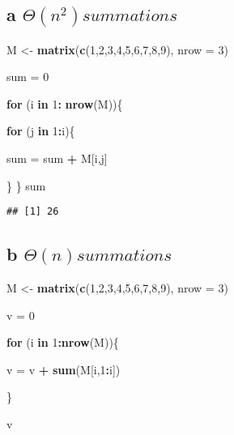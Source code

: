 \documentclass[
]{article}
\newenvironment{Shaded}{\begin{snugshade}}{\end{snugshade}}
\newcommand{\ControlFlowTok}[1]{\textcolor[rgb]{0.13,0.29,0.53}{\textbf{#1}}}
\newcommand{\DataTypeTok}[1]{\textcolor[rgb]{0.13,0.29,0.53}{#1}}
\newcommand{\DecValTok}[1]{\textcolor[rgb]{0.00,0.00,0.81}{#1}}
\newcommand{\KeywordTok}[1]{\textcolor[rgb]{0.13,0.29,0.53}{\textbf{#1}}}
\newcommand{\NormalTok}[1]{#1}
\newcommand{\OperatorTok}[1]{\textcolor[rgb]{0.81,0.36,0.00}{\textbf{#1}}}
\newcommand{\StringTok}[1]{\textcolor[rgb]{0.31,0.60,0.02}{#1}}
\begin{document}
\hypertarget{a-thetan2-summations}{%
\subsection{\texorpdfstring{a
\(\Theta(n^2) summations\)}{a \textbackslash Theta(n\^{}2) summations}}\label{a-thetan2-summations}}

\begin{Shaded}
\begin{Highlighting}[]
\NormalTok{M <-}\StringTok{ }\KeywordTok{matrix}\NormalTok{(}\KeywordTok{c}\NormalTok{(}\DecValTok{1}\NormalTok{,}\DecValTok{2}\NormalTok{,}\DecValTok{3}\NormalTok{,}\DecValTok{4}\NormalTok{,}\DecValTok{5}\NormalTok{,}\DecValTok{6}\NormalTok{,}\DecValTok{7}\NormalTok{,}\DecValTok{8}\NormalTok{,}\DecValTok{9}\NormalTok{), }\DataTypeTok{nrow =} \DecValTok{3}\NormalTok{)}

\NormalTok{sum =}\StringTok{ }\DecValTok{0}

\ControlFlowTok{for}\NormalTok{ (i }\ControlFlowTok{in} \DecValTok{1}\OperatorTok{:}\StringTok{ }\KeywordTok{nrow}\NormalTok{(M))\{}

    \ControlFlowTok{for}\NormalTok{ (j }\ControlFlowTok{in} \DecValTok{1}\OperatorTok{:}\NormalTok{i)\{}
    
\NormalTok{    sum =}\StringTok{ }\NormalTok{sum }\OperatorTok{+}\StringTok{ }\NormalTok{M[i,j]}
    
\NormalTok{  \}}
\NormalTok{\}}
\NormalTok{sum}
\end{Highlighting}
\end{Shaded}

\begin{verbatim}
## [1] 26
\end{verbatim}

\hypertarget{b-thetan-summations}{%
\subsection{\texorpdfstring{b
\(\Theta{(n)} summations\)}{b \textbackslash Theta\{(n)\} summations}}\label{b-thetan-summations}}

\begin{Shaded}
\begin{Highlighting}[]
\NormalTok{M <-}\StringTok{ }\KeywordTok{matrix}\NormalTok{(}\KeywordTok{c}\NormalTok{(}\DecValTok{1}\NormalTok{,}\DecValTok{2}\NormalTok{,}\DecValTok{3}\NormalTok{,}\DecValTok{4}\NormalTok{,}\DecValTok{5}\NormalTok{,}\DecValTok{6}\NormalTok{,}\DecValTok{7}\NormalTok{,}\DecValTok{8}\NormalTok{,}\DecValTok{9}\NormalTok{), }\DataTypeTok{nrow =} \DecValTok{3}\NormalTok{)}

\NormalTok{v =}\StringTok{ }\DecValTok{0}

\ControlFlowTok{for}\NormalTok{ (i }\ControlFlowTok{in} \DecValTok{1}\OperatorTok{:}\KeywordTok{nrow}\NormalTok{(M))\{}
 
\NormalTok{ v =}\StringTok{ }\NormalTok{v }\OperatorTok{+}\StringTok{ }\KeywordTok{sum}\NormalTok{(M[i,}\DecValTok{1}\OperatorTok{:}\NormalTok{i])}
 
\NormalTok{\}}

\NormalTok{v}
\end{Highlighting}
\end{Shaded}
\end{document}
